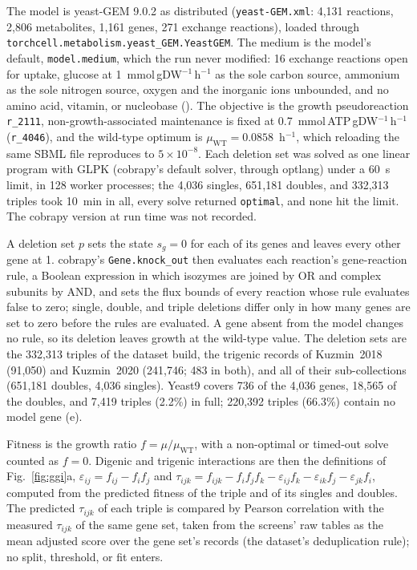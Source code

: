  The model is yeast-GEM 9.0.2 as distributed
(\texttt{yeast-GEM.xml}: 4,131 reactions, 2,806 metabolites, 1,161 genes, 271 exchange
reactions), loaded through \texttt{torchcell.metabolism.yeast\_GEM.YeastGEM}. The medium is
the model's default, \texttt{model.medium}, which the run never modified: 16 exchange
reactions open for uptake, glucose at 1~mmol\,gDW$^{-1}$\,h$^{-1}$ as the sole carbon source,
ammonium as the sole nitrogen source, oxygen and the inorganic ions unbounded, and no amino
acid, vitamin, or nucleobase (). The objective is the growth
pseudoreaction \texttt{r\_2111}, non-growth-associated maintenance is fixed at
0.7~mmol\,ATP\,gDW$^{-1}$\,h$^{-1}$ (\texttt{r\_4046}), and the wild-type optimum is
$\mu_{\mathrm{WT}}=0.0858$~h$^{-1}$, which reloading the same SBML file reproduces to
$5\times10^{-8}$. Each deletion set was solved as one linear program with GLPK (cobrapy's
default solver, through optlang) under a 60~s limit, in 128 worker processes; the
4,036 singles, 651,181 doubles, and 332,313 triples took 10~min in all, every solve returned
\texttt{optimal}, and none hit the limit. The cobrapy version at run time was not recorded.

 A deletion set $p$ sets the state $s_g=0$ for each of its genes
and leaves every other gene at 1. cobrapy's \texttt{Gene.knock\_out} then evaluates each
reaction's gene-reaction rule, a Boolean expression in which isozymes are joined by OR and
complex subunits by AND, and sets the flux bounds of every reaction whose rule evaluates
false to zero; single, double, and triple deletions differ only in how many genes are set to
zero before the rules are evaluated. A gene absent from the model changes no rule, so its
deletion leaves growth at the wild-type value. The deletion sets are the 332,313 triples of
the dataset build, the trigenic records of Kuzmin~2018 (91,050) and Kuzmin~2020 (241,746;
483 in both), and all of their sub-collections (651,181 doubles, 4,036 singles). Yeast9
covers 736 of the 4,036 genes, 18,565 of the doubles, and 7,419 triples (2.2\%) in full;
220,392 triples (66.3\%) contain no model gene (e).

 Fitness is the growth ratio $f=\mu/\mu_{\mathrm{WT}}$,
with a non-optimal or timed-out solve counted as $f=0$. Digenic and trigenic interactions
are then the definitions of Fig.~\ref{fig:ggi}a, $\varepsilon_{ij}=f_{ij}-f_if_j$ and
$\tau_{ijk}=f_{ijk}-f_if_jf_k-\varepsilon_{ij}f_k-\varepsilon_{ik}f_j-\varepsilon_{jk}f_i$,
computed from the predicted fitness of the triple and of its singles and doubles. The
predicted $\tau_{ijk}$ of each triple is compared by Pearson correlation with the measured
$\tau_{ijk}$ of the same gene set, taken from the screens' raw tables as the mean adjusted
score over the gene set's records (the dataset's deduplication rule); no split, threshold, or
fit enters.

